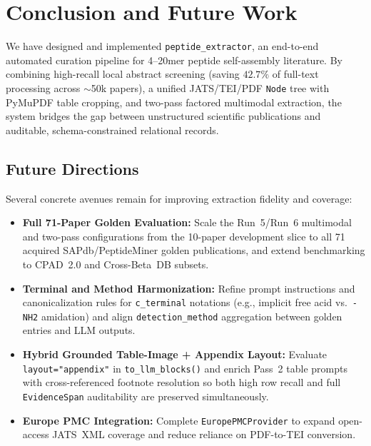 \section{Conclusion and Future Work}
\label{sec:conclusion}

We have designed and implemented \texttt{peptide\_extractor}, an end-to-end automated curation pipeline for 4--20mer peptide self-assembly literature. By combining high-recall local abstract screening (saving $42.7\%$ of full-text processing across $\sim$50k papers), a unified JATS/TEI/PDF \texttt{Node} tree with PyMuPDF table cropping, and two-pass factored multimodal extraction, the system bridges the gap between unstructured scientific publications and auditable, schema-constrained relational records.

\subsection{Future Directions}
Several concrete avenues remain for improving extraction fidelity and coverage:
\begin{itemize}
    \item \textbf{Full 71-Paper Golden Evaluation:} Scale the Run~5/Run~6 multimodal and two-pass configurations from the 10-paper development slice to all 71 acquired SAPdb/PeptideMiner golden publications, and extend benchmarking to CPAD~2.0 and Cross-Beta~DB subsets.
    \item \textbf{Terminal and Method Harmonization:} Refine prompt instructions and canonicalization rules for \texttt{c\_terminal} notations (e.g., implicit free acid vs.\ \texttt{-NH2} amidation) and align \texttt{detection\_method} aggregation between golden entries and LLM outputs.
    \item \textbf{Hybrid Grounded Table-Image + Appendix Layout:} Evaluate \texttt{layout="appendix"} in \texttt{to\_llm\_blocks()} and enrich Pass~2 table prompts with cross-referenced footnote resolution so both high row recall and full \texttt{EvidenceSpan} auditability are preserved simultaneously.
    \item \textbf{Europe PMC Integration:} Complete \texttt{EuropePMCProvider} to expand open-access JATS~XML coverage and reduce reliance on PDF-to-TEI conversion.
\end{itemize}
